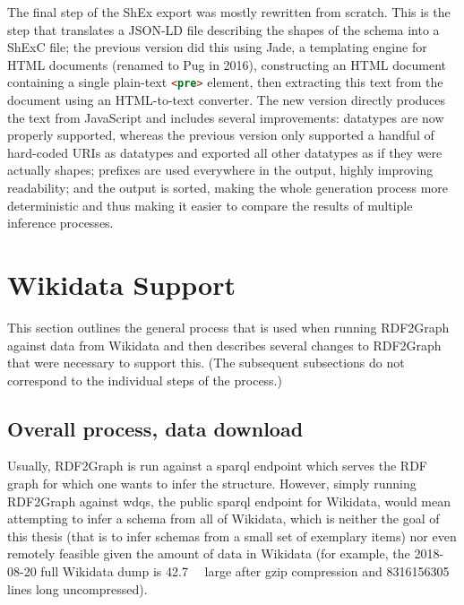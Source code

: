 The final step of the ShEx export was mostly rewritten from scratch.
This is the step that translates a JSON-LD file describing the shapes of the schema
into a ShExC file;
the previous version did this using Jade,
a templating engine for HTML documents (renamed to Pug in 2016),
constructing an HTML document containing a single plain-text \lstinline[language=html]{<pre>} element,
then extracting this text from the document using an HTML-to-text converter.
The new version directly produces the text from JavaScript
and includes several improvements:
datatypes are now properly supported,
whereas the previous version only supported a handful of hard-coded URIs as datatypes
and exported all other datatypes as if they were actually shapes;
prefixes are used everywhere in the output, highly improving readability;
and the output is sorted, making the whole generation process more deterministic
and thus making it easier to compare the results of multiple inference processes.


\section{Wikidata Support}
\label{sec:RDF2Graph+Wikidata:Wikidata}

This section outlines the general process that is used when running RDF2Graph against data from Wikidata
and then describes several changes to RDF2Graph that were necessary to support this.
(The subsequent subsections do not correspond to the individual steps of the process.)

\subsection{Overall process, data download}
\label{subsec:RDF2Graph+Wikidata:Wikidata:download}

Usually, RDF2Graph is run against a \gls{sparql} endpoint
which serves the RDF graph for which one wants to infer the structure.
However, simply running RDF2Graph against \acrfull{wdqs}, the public \gls{sparql} endpoint for Wikidata,
would mean attempting to infer a schema from all of Wikidata,
which is neither the goal of this thesis
(that is to infer schemas from a small set of exemplary items)
nor even remotely feasible given the amount of data in Wikidata
(for example, the 2018-08-20 full Wikidata dump is \SI{42.7}{\giga\byte} large after gzip compression %
and \num{8316156305} lines long uncompressed).

